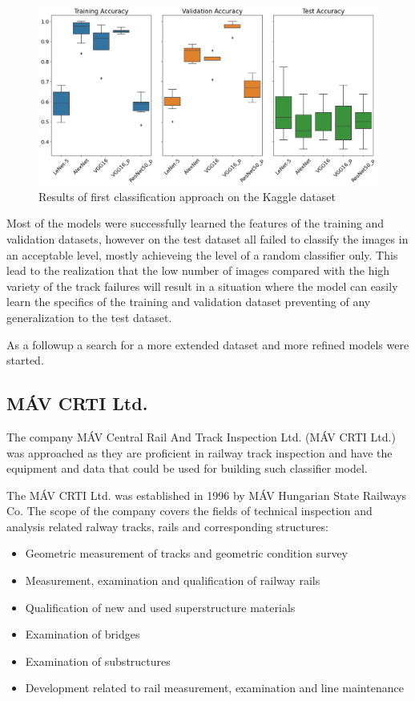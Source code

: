 \begin{figure}[!ht]
    \centering
    \includegraphics[width=\textwidth]{./tex_images/bootstrap_results.png}
    \caption{Results of first classification approach on the Kaggle dataset}
    \label{fig:Kaggle_results}
\end{figure}

Most of the models were successfully learned the features of the training and validation datasets,
however on the test dataset all failed to classify the images in an acceptable level, mostly
achieveing the level of a random classifier only.
This lead to the realization that the low number of images compared with the high variety of the track
failures will result in a situation where the model can easily learn the specifics of the training and
validation dataset preventing of any generalization to the test dataset.

As a followup a search for a more extended dataset and more refined models were started.

\subsection{MÁV CRTI Ltd.}

The company MÁV Central Rail And Track Inspection Ltd. (MÁV CRTI Ltd.) \cite{_mav_} was approached
as they are proficient in railway track inspection and have the equipment and data that could be used
for building such classifier model.

The MÁV CRTI Ltd. was established in 1996 by MÁV Hungarian State Railways Co.
The scope of the company covers the fields of technical inspection and analysis related
ralway tracks, rails and corresponding structures:
\begin{itemize}
    \item Geometric measurement of tracks and geometric condition survey
    \item Measurement, examination and qualification of railway rails
    \item Qualification of new and used superstructure materials
    \item Examination of bridges
    \item Examination of substructures
    \item Development related to rail measurement, examination and line maintenance
\end{itemize}

